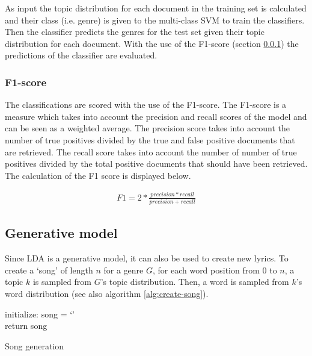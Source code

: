 As input the topic distribution for each document in the training set is calculated and their class (i.e. genre) is given to the multi-class SVM to train the classifiers. Then the classifier predicts the genres for the test set given their topic distribution for each document. With the use of the F1-score (section \ref{sub:f1}) the predictions of the classifier are evaluated.

\subsubsection{F1-score}\label{sub:f1}
The classifications are scored with the use of the F1-score. The F1-score is a measure which takes into account the precision and recall scores of the model and can be seen as a weighted average. The precision score takes into account the number of true positives divided by the true and false positive documents that are retrieved. The recall score takes into account the number of number of true positives divided by the total positive documents that should have been retrieved. The calculation of the F1 score is displayed below.

\begin{align}
F1 = 2 * \frac{precision * recall }{precision + recall}
\end{align}


\subsection{Generative model}\label{sub:song}
Since LDA is a generative model, it can also be used to create new lyrics. To create a `song' of length $n$ for a genre $G$, for each word position from $0$ to $n$, a topic $k$ is sampled from $G$'s topic distribution. Then, a word is sampled from $k$'s word distribution (see also algorithm \ref{alg:create-song}). \\
\begin{mdframed}
\begin{algorithm}[H]\label{alg:create-song}
 initialize: song = `' \\
 return song
 \caption{Song generation}
\end{algorithm}
\end{mdframed}

